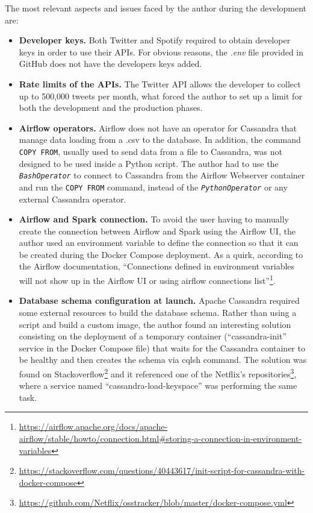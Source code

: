 

\nonzeroparskip The most relevant aspects and issues faced by the author during the development are:
\begin{itemize}
	\item \textbf{Developer keys.} Both Twitter and Spotify required to obtain developer keys in order to use their APIs. For obvious reasons, the \textit{.env} file provided in GitHub does not have the developers keys added.
	\item \textbf{Rate limits of the APIs.} The Twitter API allows the developer to collect up to 500,000 tweets per month, what forced the author to set up a limit for both the development and the production phases.
	\item \textbf{Airflow operators.} Airflow does not have an operator for Cassandra that manage data loading from a .csv to the database. In addition, the command \texttt{COPY FROM}, usually used to send data from a file to Cassandra, was not designed to be used inside a Python script. The author had to use the \texttt{\textit{BashOperator}} to connect to Cassandra from the Airflow Webserver container and run the \texttt{COPY FROM} command, instead of the \texttt{\textit{PythonOperator}} or any external Cassandra operator.
	\item \textbf{Airflow and Spark connection.} To avoid the user having to manually create the connection between Airflow and Spark using the Airflow UI, the author used an environment variable to define the connection so that it can be created during the Docker Compose deployment. As a quirk, according to the Airflow documentation, ``Connections defined in environment variables will not show up in the Airflow UI or using airflow connections list''\footnote{\url{https://airflow.apache.org/docs/apache-airflow/stable/howto/connection.html\#storing-a-connection-in-environment-variables}}.
	\item \textbf{Database schema configuration at launch.} Apache Cassandra required some external resources to build the database schema. Rather than using a script and build a custom image, the author found an interesting solution consisting on the deployment of a temporary container (``cassandra-init'' service in the Docker Compose file) that waits for the Cassandra container to be healthy and then creates the schema via cqlsh command. The solution was found on Stackoverflow\footnote{\url{https://stackoverflow.com/questions/40443617/init-script-for-cassandra-with-docker-compose}} and it referenced one of the Netflix's repositories\footnote{\url{https://github.com/Netflix/osstracker/blob/master/docker-compose.yml}}, where a service named ``cassandra-load-keyspace'' was performing the same task.

\end{itemize}
